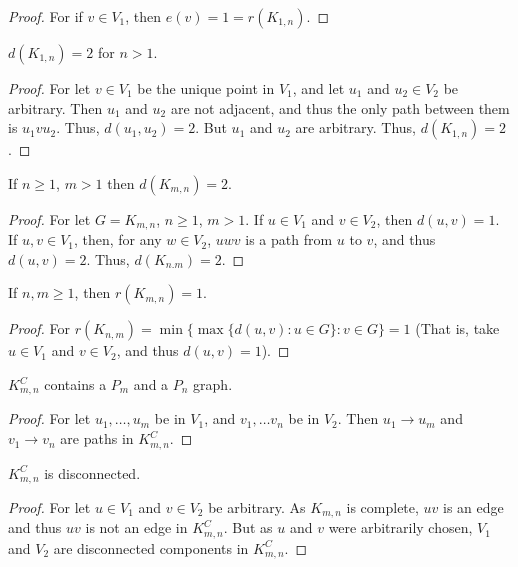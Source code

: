         \begin{proof}
        For if $v\in V_1$, then $e(v) = 1 = r(K_{1,n})$.
        \end{proof}
        \begin{theorem}
        $d(K_{1,n})=2$ for $n>1$.
        \end{theorem}
        \begin{proof}
        For let $v\in V_1$ be the unique point in $V_1$, and let $u_1$ and $u_2 \in V_2$ be arbitrary. Then $u_1$ and $u_2$ are not adjacent, and thus the only path between them is $u_1 v u_2$. Thus, $d(u_1,u_2) = 2$. But $u_1$ and $u_2$ are arbitrary. Thus, $d(K_{1,n}) = 2$.
        \end{proof}
        \begin{theorem}
        If $n\geq1$, $m> 1$ then $d(K_{m,n}) = 2$.
        \end{theorem}
        \begin{proof}
        For let $G=K_{m,n}$, $n\geq1$, $m> 1$. If $u\in V_1$ and $v\in V_2$, then $d(u,v) = 1$. If $u,v\in V_1$, then, for any $w\in V_2$, $uwv$ is a path from $u$ to $v$, and thus $d(u,v) = 2$. Thus, $d(K_{n.m}) = 2$.
        \end{proof}
        \begin{theorem}
        If $n,m\geq 1$, then $r(K_{m,n}) = 1$.
        \end{theorem}
        \begin{proof}
        For $r(K_{n,m}) = \min\{ \max\{d(u,v):u\in G\}: v\in G\} = 1$ (That is, take $u\in V_1$ and $v\in V_2$, and thus $d(u,v)=1$).
        \end{proof}
        \begin{theorem}
        $K_{m,n}^C$ contains a $P_m$ and a $P_n$ graph.
        \end{theorem}
        \begin{proof}
        For let $u_1,\hdots, u_m$ be in $V_1$, and $v_1,\hdots v_n$ be in $V_2$. Then $u_1 \rightarrow u_m$ and $v_1 \rightarrow v_n$ are paths in $K_{m,n}^C$.
        \end{proof}
        \begin{theorem}
        $K_{m,n}^C$ is disconnected.
        \end{theorem}
        \begin{proof}
        For let $u\in V_1$ and $v\in V_2$ be arbitrary. As $K_{m,n}$ is complete, $uv$ is an edge and thus $uv$ is not an edge in $K_{m,n}^C$. But as $u$ and $v$ were arbitrarily chosen, $V_1$ and $V_2$ are disconnected components in $K_{m,n}^C$.
        \end{proof}
